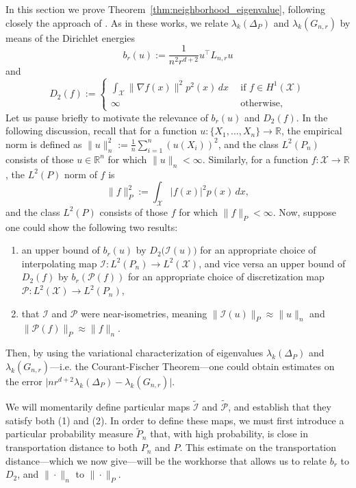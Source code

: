 \documentclass[twoside]{article}
\newcommand{\Reals}{\mathbb{R}}
\newcommand{\1}{\mathbf{1}}
\newcommand{\Lap}{L}
\newcommand{\Xset}{\mathcal{X}}
\newcommand{\Leb}{L}
\newcommand{\mc}[1]{\mathcal{#1}}
\newcommand{\wt}[1]{\widetilde{#1}}
\theoremstyle{definition}
\theoremstyle{remark}
\begin{document}
In this section we prove Theorem~\ref{thm:neighborhood_eigenvalue}, following closely the approach of \citet{burago2014,trillos2019,calder2019}. As in these works, we relate $\lambda_k(\Delta_P)$ and $\lambda_k(G_{n,r})$ by means of the Dirichlet energies
\begin{equation*}
b_r(u) := \frac{1}{n^2 r^{d+ 2}}u^{\top} \Lap_{n,r} u 
\end{equation*}
and
\begin{equation*}
D_2(f) :=
\begin{cases*}
\int_{\Xset} \|\nabla f(x)\|^2 p^2(x) \,dx~~ &\textrm{if $f \in H^1(\Xset)$} \\
\infty~~ & \textrm{otherwise,}
\end{cases*}
\end{equation*}
Let us pause briefly to motivate the relevance of $b_r(u)$ and $D_2(f)$. In the following discussion, recall that for a function $u: \{X_1,\ldots,X_n\} \to \Reals$, the empirical norm is defined as $\|u\|_n^2 := \frac{1}{n} \sum_{i = 1}^{n} (u(X_i))^2$, and the class $\Leb^2(P_n)$ consists of those $u \in \Reals^n$ for which $\|u\|_{n} < \infty$. Similarly, for a function $f: \Xset \to \Reals$, the $L^2(P)$ norm of $f$ is
\begin{equation*}
\|f\|_{P}^2 := \int_{\Xset} \bigl|f(x)\bigr|^2 p(x) \,dx,
\end{equation*} 
and the class $\Leb^2(P)$ consists of those $f$ for which $\|f\|_P < \infty$. Now, suppose one could show the following two results: 
\begin{enumerate}[(1)]
	\item an upper bound of $b_r(u)$ by $D_2\bigl(\mc{I}(u)\bigr)$ for an appropriate choice of interpolating map $\mc{I}: \Leb^2(P_n) \to \Leb^2(\mc{X})$, and vice versa an upper bound of $D_2(f)$ by $b_r(\mc{P}(f))$ for an appropriate choice of discretization map $\mc{P}: \Leb^2(\mc{X}) \to \Leb^2(P_n)$,
	\item that $\mc{I}$ and $\mc{P}$ were near-isometries, meaning $\|\mc{I}(u)\|_{P} \approx \|u\|_{n}$ and $\|\mc{P}(f)\|_{P} \approx \|f\|_{n}$.
\end{enumerate}
Then, by using the variational characterization of eigenvalues $\lambda_k(\Delta_P)$ and $\lambda_k(G_{n,r})$---i.e. the Courant-Fischer Theorem---one could obtain estimates on the error $\bigl|nr^{d + 2}\lambda_k(\Delta_P) - \lambda_k(G_{n,r})\bigr|$.

We will momentarily define particular maps $\wt{\mc{I}}$ and $\wt{\mc{P}}$, and establish that they satisfy both (1) and (2). In order to define these maps, we must first introduce a particular probability measure $\wt{P}_n$ that, with high probability, is close in transportation distance to both $P_n$ and $P$. This estimate on the transportation distance---which we now give---will be the workhorse that allows us to relate $b_r$ to $D_2$, and $\|\cdot\|_n$ to $\|\cdot\|_P$.
\end{document}
